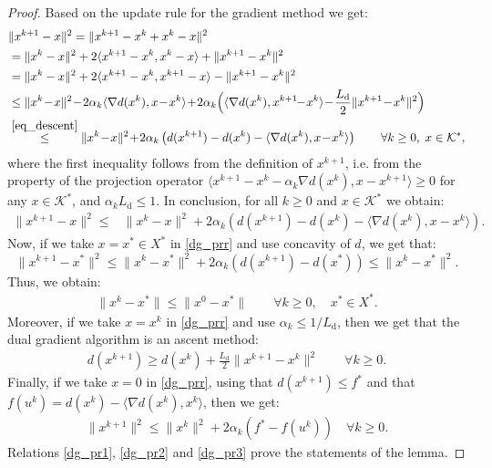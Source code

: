 \documentclass{gOMS2e}
\theoremstyle{plain}
\theoremstyle{definition}
\theoremstyle{remark}
\begin{document}
\begin{proof} Based on the update rule for the gradient method we get:
\begin{align*}
& \| x^{k+1} - x \|^2 =  \| x^{k+1} -  x^k + x^k -  x \|^2 \\
& =  \| x^k - x \|^2 + 2 \langle x^{k+1} -
x^k, x^k - x \rangle + \| x^{k+1} - x^k \|^2\\
& = \| x^k - x \|^2 + 2 \langle x^{k+1} - x^k, x^{k+1} - x
\rangle - \| x^{k+1} - x^k \|^2 \\
& \leq  \| x^k \!-\! x \|^2 \!-\! 2 \alpha_k \langle \nabla
d(x^{k}), x \!-\! x^k\rangle \!+\! 2 \alpha_k \Big(  \langle \nabla
d(x^{k}), x^{k+1} \!\!-\! x^k \rangle \!-\! \frac{L_{\text{d}}}{2}
\| x^{k+1} \!-\! x^k \|^2 \Big)\\
& \overset{\eqref{eq_descent}}{\leq} \| x^k \!-\! x \|^2 \!+\!  2
\alpha_k \left(  d(x^{k+1}) - d(x^k) - \langle \nabla d(x^{k}), x
\!-\! x^k\rangle \right ) \qquad  \forall k \geq 0, \; x \in
{{\mathcal{K}}^*},
\end{align*}
where the first inequality follows from  the definition of
$x^{k+1}$, i.e. from the property of the projection operator
$\langle x^{k+1} - x^k - \alpha_k  \nabla d(x^k), x - x^{k+1}\rangle
\geq 0$ for any $x \in {{\mathcal{K}}^*}$, and $\alpha_k  L_{\text{d}} \leq
1$. In conclusion, for all $k \geq 0$ and  $x \in {{\mathcal{K}}^*}$ we
obtain:
\begin{align}
\label{dg_prr} \| x^{k+1} - x \|^2 \leq & \| x^k - x \|^2   + 2
\alpha_k \left( d(x^{k+1}) - d(x^k) - \langle \nabla d(x^k), x - x^k
\rangle \right).
\end{align}
Now, if we take $x = x^* \in X^*$ in \eqref{dg_prr} and use
concavity of $d$, we get that: $$\| x^{k+1} - x^* \|^2 \leq \| x^k -
x^* \|^2 + 2 \alpha_k \left( d(x^{k+1}) - d(x^*) \right) \leq \| x^k
- x^* \|^2.
$$ Thus, we obtain:
\begin{align}
\label{dg_pr1} \| x^k - x^* \| \leq \| x^0 - x^* \| \qquad \forall k
\geq 0, \quad x^* \in X^*.
\end{align}
Moreover, if we take $x = x^k$ in \eqref{dg_prr} and use $\alpha_k
\leq 1/L_\text{d}$, then we get that the dual gradient algorithm is
an ascent method:
\begin{align}
\label{dg_pr2} d(x^{k+1}) \geq d(x^k) + \frac{L_\text{d}}{2} \|
x^{k+1} - x^k \|^2 \qquad \forall k \geq 0.
\end{align}
Finally, if we take $x = 0$ in \eqref{dg_prr}, using that
$d(x^{k+1}) \leq f^*$ and that $f(u^k) = d(x^k) - \langle \nabla
d(x^k),  x^k \rangle $, then we get:
\begin{align}
\label{dg_pr3} \|x^{k+1}\|^2 \leq \|x^k\|^2 + 2 \alpha_k (f^* -
f(u^k)) \quad \forall k \geq 0.
\end{align}
Relations \eqref{dg_pr1}, \eqref{dg_pr2} and \eqref{dg_pr3} prove
the statements of the lemma.
\end{proof}
\end{document}
